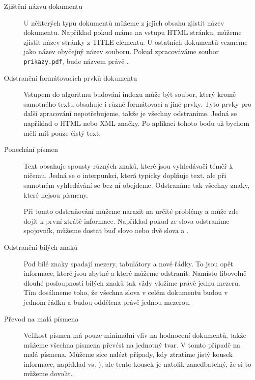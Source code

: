 \documentclass[12pt]{article}
\newcommand{\code}[1]{\texttt{#1}}
\begin{document}
\begin{description}
\item[Zjištění názvu dokumentu] U některých typů dokumentů můžeme z jejich obsahu zjistit název dokumentu. Například pokud máme na vstupu HTML stránku, můžeme zjistit název stránky z TITLE elementu. U ostatních dokumentů vezmeme jako název obyčejný název souboru. Pokud zpracováváme soubor \code{prikazy.pdf}, bude názvem právě .

\item[Odstranění formátovacích prvků dokumentu] Vstupem do algoritmu budování indexu může být soubor, který kromě samotného textu obsahuje i různé formátovací a jiné prvky. Tyto prvky pro další zpracování nepotřebujeme, takže je všechny odstraníme. Jedná se například o HTML nebo XML značky. Po aplikaci tohoto bodu už bychom měli mít pouze čistý text. 

\item[Ponechání písmen] Text obsahuje spousty různých znaků, které jsou vyhledávači téměř k ničemu. Jedná se o interpunkci, která typicky doplňuje text, ale při samotném vyhledávání se bez ní obejdeme. Odstraníme tak všechny znaky, které nejsou písmeny. 

Při tomto odstraňování můžeme narazit na určité problémy a může zde dojít k první ztrátě informace. Například pokud ze slova  odstraníme spojovník, můžeme dostat buď slovo  nebo dvě slova  a . 

\item[Odstranění bílých znaků] Pod bílé znaky spadají mezery, tabulátory a nové řádky. To jsou opět informace, které jsou zbytné a které můžeme odstranit. Namísto libovolně dlouhé posloupnosti bílých znaků tak vždy vložíme právě jednu mezeru. Tím dosáhneme toho, že všechna slova v celém dokumentu budou v jednom řádku a budou oddělena právě jednou mezerou. 

\item[Převod na malá písmena] Velikost písmen má pouze minimální vliv na hodnocení dokumentů, takže můžeme všechna písmena převést na jednotný tvar. V tomto případě na malá písmena. Můžeme sice nalézt případy, kdy ztratíme jistý kousek informace, například  vs. ), ale tento kousek je natolik zanedbatelný, že si to můžeme dovolit. 



\end{description}
\end{document}
